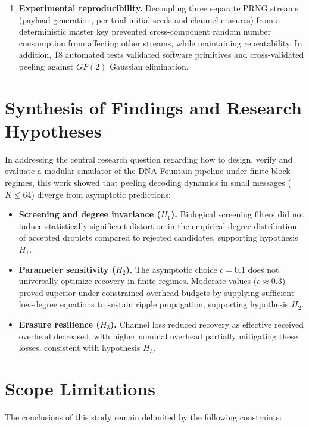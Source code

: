 \begin{enumerate}
    \item \textbf{Experimental reproducibility.} Decoupling three separate PRNG streams (payload generation, per-trial initial seeds and channel erasures) from a deterministic master key prevented cross-component random number consumption from affecting other streams, while maintaining repeatability. In addition, 18 automated tests validated software primitives and cross-validated peeling against $GF(2)$ Gaussian elimination.
\end{enumerate}

\section{Synthesis of Findings and Research Hypotheses}

In addressing the central research question regarding how to design, verify and evaluate a modular simulator of the DNA Fountain pipeline under finite block regimes, this work showed that peeling decoding dynamics in small messages ($K \le 64$) diverge from asymptotic predictions:

\begin{itemize}
    \item \textbf{Screening and degree invariance ($H_1$).} Biological screening filters did not induce statistically significant distortion in the empirical degree distribution of accepted droplets compared to rejected candidates, supporting hypothesis $H_1$.
    
    \item \textbf{Parameter sensitivity ($H_2$).} The asymptotic choice $c = 0.1$ does not universally optimize recovery in finite regimes. Moderate values ($c \approx 0.3$) proved superior under constrained overhead budgets by supplying sufficient low-degree equations to sustain ripple propagation, supporting hypothesis $H_2$.
    
    \item \textbf{Erasure resilience ($H_3$).} Channel loss reduced recovery as effective received overhead decreased, with higher nominal overhead partially mitigating these losses, consistent with hypothesis $H_3$.
\end{itemize}

\section{Scope Limitations}

The conclusions of this study remain delimited by the following constraints:

